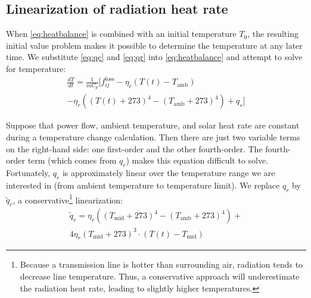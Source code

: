 \documentclass[conference]{IEEEtran}
\begin{document}
\subsection{Linearization of radiation heat rate}

When \eqref{eq:heatbalance} is combined with an initial temperature $T_0$, the resulting initial value problem makes it possible to determine the temperature at any later time. We substitute \eqref{eq:qc} and \eqref{eq:qr} into \eqref{eq:heatbalance} and attempt to solve for temperature:
\begin{multline}\label{eq:heatbalance_approx}
\frac{dT}{dt} = \frac{1}{mC_p}\big[ f_{ij}^\text{loss} - \eta_c\left( T(t) - T_\text{amb}\right) \\ - \eta_r\left((T(t) + 273)^4 - (T_\text{amb} + 273)^4\right) + q_s \big]
\end{multline}

Suppose that power flow, ambient temperature, and solar heat rate are constant during a temperature change calculation. Then there are just two variable terms on the right-hand side: one first-order and the other fourth-order. The fourth-order term (which comes from $q_r$) makes this equation difficult to solve. Fortunately, $q_r$ is approximately linear over the temperature range we are interested in (from ambient temperature to temperature limit). We replace $q_r$ by $\tilde{q}_r$, a conservative\footnote{Because a transmission line is hotter than surrounding air, radiation tends to decrease line temperature. Thus, a conservative approach will underestimate the radiation heat rate, leading to slightly higher temperatures.} linearization:
\begin{multline}\label{eq:approx_rad}
\tilde{q}_r = \eta_r  \left( (T_\text{mid} + 273)^4 - (T_\text{amb} + 273)^4\right) + \\ 4\eta_r(T_\text{mid} + 273)^3\cdot(T(t) - T_\text{mid})
\end{multline}
%
\end{document}
